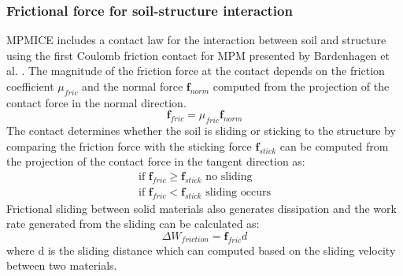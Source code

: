 \documentclass[preprint,12pt]{elsarticle}
\begin{document}
\subsubsection{Frictional force for soil-structure interaction}
MPMICE includes a contact law for the interaction between soil and structure using the first Coulomb friction contact for MPM presented by Bardenhagen et al. \cite{MPMcontact}.  The magnitude of the friction force at the contact depends on the friction coefficient $\mu_{fric}$ and the normal force  $ \pmb{f}_{norm}$  computed from the projection of the contact force  in the normal direction.
%
\begin{equation}
   \pmb{f}_{fric} = \mu_{fric}  \pmb{f}_{norm}
\end {equation}
%
%
The contact determines whether the soil is sliding or sticking to the structure by comparing the friction force with the sticking force $\pmb{f}_{stick}$  can be computed from the projection of the contact force in the tangent direction as:
%
\begin{equation}
\begin{gathered}
\textrm{   if    }    \pmb{f}_{fric} \geq  \pmb{f}_{stick}   \textrm{    no sliding    } \\
\textrm{    if    }   \pmb{f}_{fric} <   \pmb{f}_{stick}   \textrm{    sliding occurs    }  
\end {gathered}
\end {equation}
Frictional sliding between solid materials also generates dissipation and the work rate generated from the sliding can be calculated as:
%
\begin{equation}
   \Delta W_{friction} = \pmb{f}_{fric} d
\end {equation}
%
%
where d is the sliding distance which can computed based on the sliding velocity between two materials. 
\end{document}
